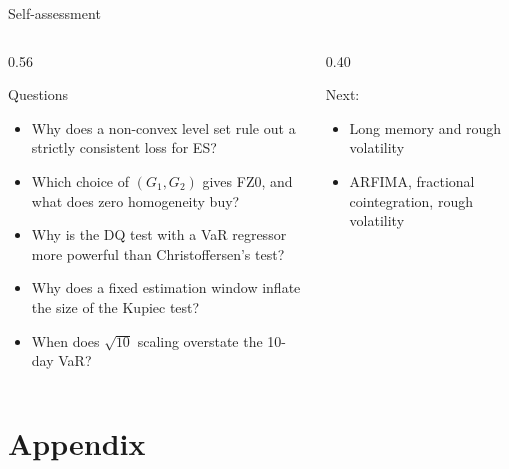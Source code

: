 \begin{frame}{Self-assessment}
\itemsize{\small}
\begin{columns}[T]
\begin{column}{0.56\textwidth}
\begin{block}{Questions}
\begin{itemize}
    \item Why does a non-convex level set rule out a strictly consistent loss for ES?
    \item Which choice of $(G_1, G_2)$ gives FZ0, and what does zero homogeneity buy?
    \item Why is the DQ test with a VaR regressor more powerful than Christoffersen's test?
    \item Why does a fixed estimation window inflate the size of the Kupiec test?
    \item When does $\sqrt{10}$ scaling overstate the 10-day VaR?
\end{itemize}
\end{block}
\end{column}
\begin{column}{0.40\textwidth}
\begin{block}{Next: }
\begin{itemize}
    \item Long memory and rough volatility
    \item ARFIMA, fractional cointegration, rough volatility
\end{itemize}
\end{block}
\end{column}
\end{columns}
\end{frame}


\section{Appendix}

